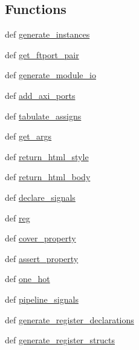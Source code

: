 \subsection*{Functions}
\begin{DoxyCompactItemize}
\item 
def \hyperlink{namespaceverilog__generator_acb4e047f1654d4a6efb2c360ec8c1d23}{generate\-\_\-instances}
\item 
def \hyperlink{namespaceverilog__generator_a9eb9263648f722fbb3f2f9c4d1cda088}{get\-\_\-ftport\-\_\-pair}
\item 
def \hyperlink{namespaceverilog__generator_a17ca9d3000f5bce2be5ab46ec93cea2c}{generate\-\_\-module\-\_\-io}
\item 
def \hyperlink{namespaceverilog__generator_ae361894414ae0f5f26303fac1e6e58f1}{add\-\_\-axi\-\_\-ports}
\item 
def \hyperlink{namespaceverilog__generator_ad855928dfd70f82603a0c352f2fbdaae}{tabulate\-\_\-assigns}
\item 
def \hyperlink{namespaceverilog__generator_ae0b867df9080f5933e37b2ab48d6a006}{get\-\_\-args}
\item 
def \hyperlink{namespaceverilog__generator_a0afa389b8b04b6ee1794ec477b46580f}{return\-\_\-html\-\_\-style}
\item 
def \hyperlink{namespaceverilog__generator_a45769736577ae4988378d604c0b4c70c}{return\-\_\-html\-\_\-body}
\item 
def \hyperlink{namespaceverilog__generator_a5b1b496ee7fb13cd3daf8e146c5cc53d}{declare\-\_\-signals}
\item 
def \hyperlink{namespaceverilog__generator_a7aed88c96321f188e2ecf9cc19939c81}{reg}
\item 
def \hyperlink{namespaceverilog__generator_ae700bcdfd771712dd3276fdf04b220a3}{cover\-\_\-property}
\item 
def \hyperlink{namespaceverilog__generator_a07fb806582e66217640d2249566cc612}{assert\-\_\-property}
\item 
def \hyperlink{namespaceverilog__generator_ab85cf13d445a0532e81f0a2523e4dd22}{one\-\_\-hot}
\item 
def \hyperlink{namespaceverilog__generator_ab05810c962a9557cda78548c97752be3}{pipeline\-\_\-signals}
\item 
def \hyperlink{namespaceverilog__generator_aab311e89bc055c6a8c2ade6e49db979c}{generate\-\_\-register\-\_\-declarations}
\item 
def \hyperlink{namespaceverilog__generator_a81d2753380a5383b30d6a19e80f660a8}{generate\-\_\-register\-\_\-structs}

\end{DoxyCompactItemize}
